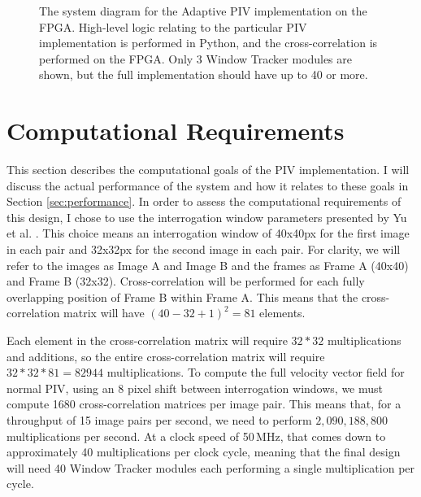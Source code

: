 \documentclass{article}
\begin{document}
\begin{figure}[htbp]
	\caption{The system diagram for the Adaptive PIV implementation on the FPGA. High-level logic relating to the particular PIV implementation is performed in Python, and the cross-correlation is performed on the FPGA. Only 3 Window Tracker modules are shown, but the full implementation should have up to 40 or more.}
	\label{fig:system}
\end{figure}

\section{Computational Requirements}
\label{sec:computation}
This section describes the computational goals of the PIV implementation. I will discuss the actual performance of the system and how it relates to these goals in Section \ref{sec:performance}. In order to assess the computational requirements of this design, I chose to use the interrogation window parameters presented by Yu et al. \citep{Yu:2006tb}. This choice means an interrogation window of 40x40px for the first image in each pair and 32x32px for the second image in each pair. For clarity, we will refer to the images as Image A and Image B and the frames as Frame A (40x40) and Frame B (32x32). Cross-correlation will be performed for each fully overlapping position of Frame B within Frame A. This means that the cross-correlation matrix will have $(40 - 32 + 1) ^2 = 81$ elements. 

Each element in the cross-correlation matrix will require $32 * 32$ multiplications and additions, so the entire cross-correlation matrix will require $32 * 32 * 81 = 82944$ multiplications. To compute the full velocity vector field for normal PIV, using an 8 pixel shift between interrogation windows, we must compute 1680 cross-correlation matrices per image pair. This means that, for a throughput of 15 image pairs per second, we need to perform $2,090,188,800$ multiplications per second. At a clock speed of 50\,MHz, that comes down to approximately 40 multiplications per clock cycle, meaning that the final design will need 40 Window Tracker modules each performing a single multiplication per cycle. 
\end{document}
